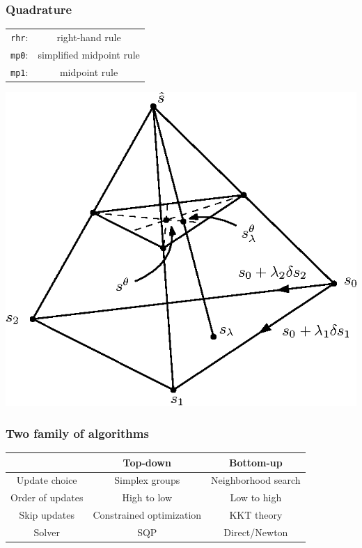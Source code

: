\documentclass{beamer}
\begin{document}
\begin{frame} %
  \frametitle{Quadrature}
  \begin{tabular}{cc}
    \texttt{rhr}: & right-hand rule \\
    \texttt{mp0}: & simplified midpoint rule \\
    \texttt{mp1}: & midpoint rule
  \end{tabular}
  \begin{center}
    \includegraphics[width=0.7\linewidth]{slowness-tetra.eps}
  \end{center}
\end{frame}

\begin{frame}
  \frametitle{Two family of algorithms}
  \begin{center}
    \begin{tabular}{c|cc}
      & Top-down & Bottom-up \\
      \midrule
      Update choice & Simplex groups & Neighborhood search \\
      Order of updates & High to low & Low to high \\
      Skip updates & Constrained optimization & KKT theory \\
      Solver & SQP & Direct/Newton
    \end{tabular}
  \end{center}
\end{frame}
\end{document}
